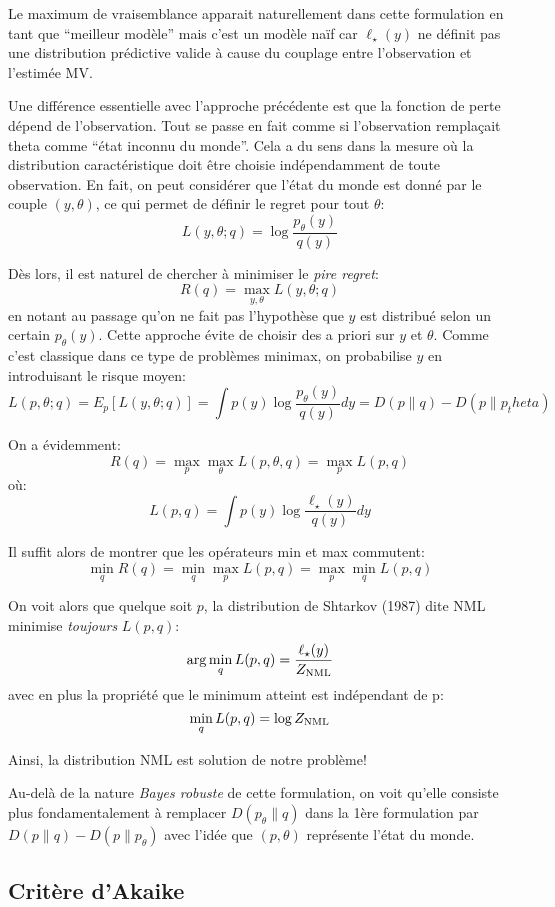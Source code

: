 \documentclass{article}
\begin{document}
Le maximum de vraisemblance apparait naturellement dans cette formulation en tant que ``meilleur mod\`ele'' mais c'est un mod\`ele na\"if car $\ell_\star(y)$ ne d\'efinit pas une distribution pr\'edictive valide \`a cause du couplage entre l'observation et l'estim\'ee MV. 

Une diff\'erence essentielle avec l'approche pr\'ec\'edente est que la fonction de perte d\'epend de l'observation. Tout se passe en fait comme si l'observation rempla\c{c}ait theta comme ``\'etat inconnu du monde''. Cela a du sens dans la mesure o\`u la distribution caract\'eristique doit \^etre choisie ind\'ependamment de toute observation. En fait, on peut consid\'erer que l'\'etat du monde est donn\'e par le couple $(y, \theta)$, ce qui permet de d\'efinir le regret pour tout $\theta$: 
$$
L(y, \theta; q) = \log \frac{p_\theta(y)}{q(y)}
$$ 

D\`es lors, il est naturel de chercher \`a minimiser le {\em pire regret}: 
$$
R(q) = \max_{y, \theta} L(y, \theta; q)
$$ 
en notant au passage qu'on ne fait pas l'hypoth\`ese que $y$ est distribu\'e selon un certain $p_\theta(y)$. Cette approche \'evite de choisir des a priori sur $y$ et $\theta$. Comme c'est classique dans ce type de probl\`emes minimax, on probabilise $y$ en introduisant le risque moyen:
$$
L(p, \theta; q) 
= E_p [L(y, \theta; q)] 
= \int p(y) \log \frac{p_\theta(y)}{q(y)} dy 
= D(p\|q) - D(p\|p_theta) 
$$ 

On a \'evidemment: 
$$R(q) = \max_p \max_\theta L(p, \theta, q) = \max_p L(p, q)$$ 
o\`u: 
$$L(p, q) = \int p(y) \log \frac{\ell_\star(y)}{q(y)} dy$$ 

Il suffit alors de montrer que les op\'erateurs min et max commutent:  
$$\min_q R(q) = \min_q \max_p L(p, q) = \max_p \min_q L(p, q)$$ 

On voit alors que quelque soit $p$, la distribution de Shtarkov (1987) dite NML minimise {\em toujours} $L(p, q)$: 
$$\arg\min_q L(p, q) = \frac{\ell_\star(y)}{Z_{\rm NML}}$$ 
avec en plus la propri\'et\'e que le minimum atteint est ind\'ependant de p: 
$$\min_q L(p, q) = \log Z_{\rm NML}$$

Ainsi, la distribution NML est solution de notre probl\`eme! 

Au-del\`a de la nature {\em Bayes robuste} de cette formulation, on voit qu'elle consiste plus fondamentalement \`a remplacer $D(p_\theta\|q)$ dans la 1\`ere formulation par $D(p\|q) - D(p\|p_\theta)$ avec l'id\'ee que $(p,\theta)$ repr\'esente l'\'etat du monde. 


\subsection{Crit\`ere d'Akaike}
\end{document}
